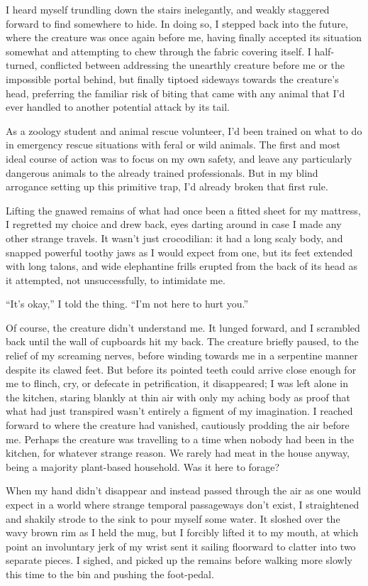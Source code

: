 I heard myself trundling down the stairs inelegantly, and weakly staggered forward to find somewhere to hide. In doing so, I stepped back into the future, where the creature was once again before me, having finally accepted its situation somewhat and attempting to chew through the fabric covering itself. I half-turned, conflicted between addressing the unearthly creature before me or the impossible portal behind, but finally tiptoed sideways towards the creature's head, preferring the familiar risk of biting that came with any animal that I’d ever handled to another potential attack by its tail.

As a zoology student and animal rescue volunteer, I’d been trained on what to do in emergency rescue situations with feral or wild animals. The first and most ideal course of action was to focus on my own safety, and leave any particularly dangerous animals to the already trained professionals. But in my blind arrogance setting up this primitive trap, I’d already broken that first rule.

Lifting the gnawed remains of what had once been a fitted sheet for my mattress, I regretted my choice and drew back, eyes darting around in case I made any other strange travels. It wasn't just crocodilian: it had a long scaly body, and snapped powerful toothy jaws as I would expect from one, but its feet extended with long talons, and wide elephantine frills erupted from the back of its head as it attempted, not unsuccessfully, to intimidate me.

``It's okay,'' I told the thing. ``I'm not here to hurt you.''

Of course, the creature didn't understand me. It lunged forward, and I scrambled back until the wall of cupboards hit my back. The creature briefly paused, to the relief of my screaming nerves, before winding towards me in a serpentine manner despite its clawed feet. But before its pointed teeth could arrive close enough for me to flinch, cry, or defecate in petrification, it disappeared; I was left alone in the kitchen, staring blankly at thin air with only my aching body as proof that what had just transpired wasn't entirely a figment of my imagination. I reached forward to where the creature had vanished, cautiously prodding the air before me. Perhaps the creature was travelling to a time when nobody had been in the kitchen, for whatever strange reason. We rarely had meat in the house anyway, being a majority plant-based household. Was it here to forage?

When my hand didn't disappear and instead passed through the air as one would expect in a world where strange temporal passageways don't exist, I straightened and shakily strode to the sink to pour myself some water. It sloshed over the wavy brown rim as I held the mug, but I forcibly lifted it to my mouth, at which point an involuntary jerk of my wrist sent it sailing floorward to clatter into two separate pieces. I sighed, and picked up the remains before walking more slowly this time to the bin and pushing the foot-pedal.

